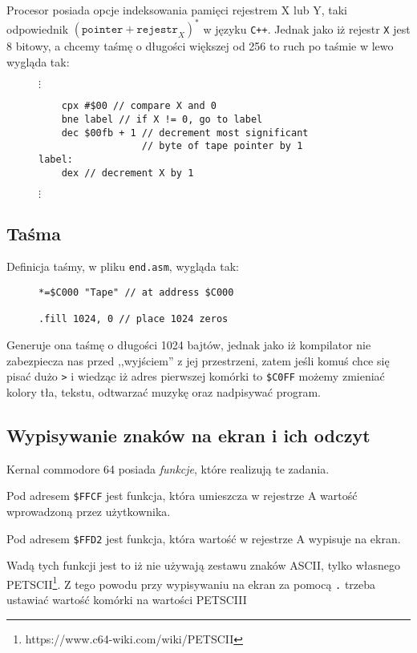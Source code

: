 \documentclass[a4paper,12pt]{article}
\begin{document}
    Procesor posiada opcje indeksowania pamięci rejestrem X lub Y, taki odpowiednik $\left(\texttt{pointer} + \texttt{rejestr}_X \right)^*$ w języku \texttt{C++}. Jednak jako iż rejestr \texttt{X} jest 8 bitowy, a chcemy taśmę o długości większej od 256 to ruch po taśmie w lewo wygląda tak:

    \begin{figure}[h]
        $\vdots$
    \centering
        \begin{lstlisting}
    cpx #$00 // compare X and 0
    bne label // if X != 0, go to label
    dec $00fb + 1 // decrement most significant 
                  // byte of tape pointer by 1
label:
    dex // decrement X by 1
        \end{lstlisting}
        $\vdots$
    \centering
    \end{figure}

    \subsection*{Taśma}

    Definicja taśmy, w pliku \texttt{end.asm}, wygląda tak:

    \begin{figure}[h]
        \begin{lstlisting}
*=$C000 "Tape" // at address $C000

.fill 1024, 0 // place 1024 zeros
        \end{lstlisting}
    \end{figure}

    Generuje ona taśmę o długości 1024 bajtów, jednak jako iż kompilator nie zabezpiecza nas przed ,,wyjściem'' z jej przestrzeni, zatem jeśli komuś chce się pisać dużo \texttt{>} i wiedząc iż adres pierwszej komórki to \texttt{\$C0FF} możemy zmieniać kolory tła, tekstu, odtwarzać muzykę oraz nadpisywać program.

    \subsection*{Wypisywanie znaków na ekran i ich odczyt}

    Kernal commodore 64 posiada \emph{funkcje}, które realizują te zadania.

    Pod adresem \texttt{\$FFCF} jest funkcja, która umieszcza w rejestrze A wartość wprowadzoną przez użytkownika.

    Pod adresem \texttt{\$FFD2} jest funkcja, która wartość w rejestrze A wypisuje na ekran.

    Wadą tych funkcji jest to iż nie używają zestawu znaków ASCII, tylko własnego PETSCII\footnote{https://www.c64-wiki.com/wiki/PETSCII}. Z tego powodu przy wypisywaniu na ekran za pomocą \texttt{.} trzeba ustawiać wartość komórki na wartości PETSCIII
    
\end{document}
